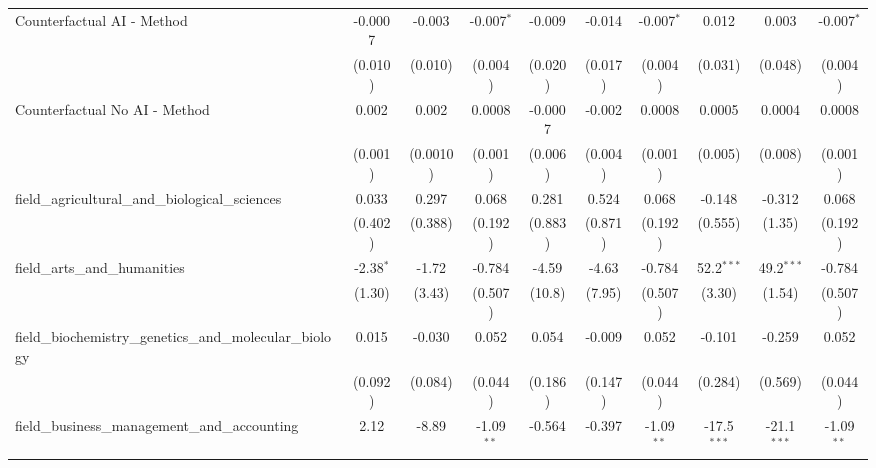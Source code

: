 \begin{tabular}{lccccccccc}
   Counterfactual AI - Method                                  & -0.0007     & -0.003        & -0.007$^{*}$  & -0.009   & -0.014     & -0.007$^{*}$  & 0.012         & 0.003         & -0.007$^{*}$\\   
                                                               & (0.010)     & (0.010)       & (0.004)       & (0.020)  & (0.017)    & (0.004)       & (0.031)       & (0.048)       & (0.004)\\   
   Counterfactual No AI - Method                               & 0.002       & 0.002         & 0.0008        & -0.0007  & -0.002     & 0.0008        & 0.0005        & 0.0004        & 0.0008\\   
                                                               & (0.001)     & (0.0010)      & (0.001)       & (0.006)  & (0.004)    & (0.001)       & (0.005)       & (0.008)       & (0.001)\\   
   field\_agricultural\_and\_biological\_sciences              & 0.033       & 0.297         & 0.068         & 0.281    & 0.524      & 0.068         & -0.148        & -0.312        & 0.068\\   
                                                               & (0.402)     & (0.388)       & (0.192)       & (0.883)  & (0.871)    & (0.192)       & (0.555)       & (1.35)        & (0.192)\\   
   field\_arts\_and\_humanities                                & -2.38$^{*}$ & -1.72         & -0.784        & -4.59    & -4.63      & -0.784        & 52.2$^{***}$  & 49.2$^{***}$  & -0.784\\   
                                                               & (1.30)      & (3.43)        & (0.507)       & (10.8)   & (7.95)     & (0.507)       & (3.30)        & (1.54)        & (0.507)\\   
   field\_biochemistry\_genetics\_and\_molecular\_biology      & 0.015       & -0.030        & 0.052         & 0.054    & -0.009     & 0.052         & -0.101        & -0.259        & 0.052\\   
                                                               & (0.092)     & (0.084)       & (0.044)       & (0.186)  & (0.147)    & (0.044)       & (0.284)       & (0.569)       & (0.044)\\   
   field\_business\_management\_and\_accounting                & 2.12        & -8.89         & -1.09$^{**}$  & -0.564   & -0.397     & -1.09$^{**}$  & -17.5$^{***}$ & -21.1$^{***}$ & -1.09$^{**}$\\   

\end{tabular}
